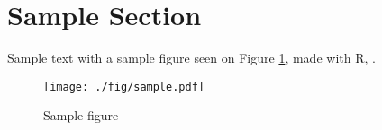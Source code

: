\section{Sample Section} \label{sec:sample}
Sample text with a sample figure seen on Figure \ref{fig:sample}, made with R, \citep{R}.

\begin{figure}[htbp]
  \centering
  \texttt{[image: ./fig/sample.pdf]}
  \caption{Sample figure}
  \label{fig:sample}
\end{figure}
